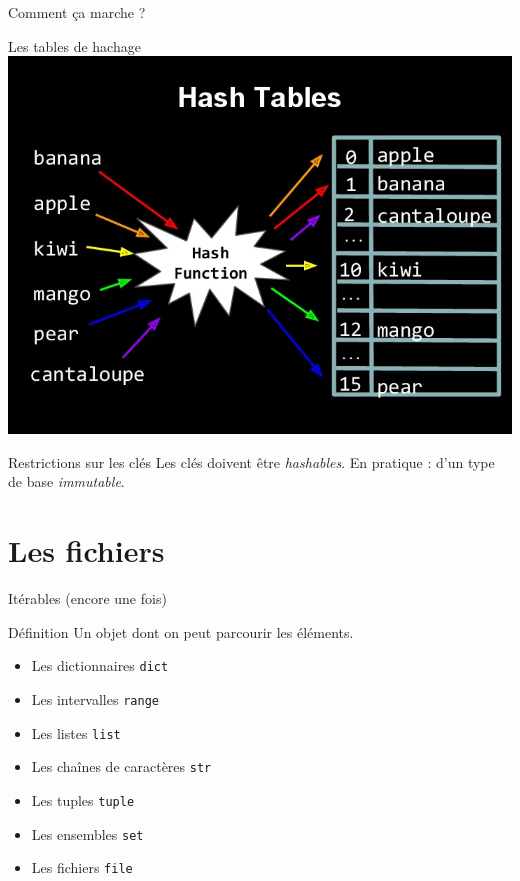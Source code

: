 \documentclass[x11names,svgnames]{beamer}
\begin{document}
\begin{frame}{Comment ça marche ?}
\begin{block}{Les tables de hachage}
  \vspace{0pt}
  \includegraphics[height=0.6\textheight]{img/hashtable.png}
\end{block}

\begin{block}{Restrictions sur les clés}
  \vspace{0pt}
  Les clés doivent être \emph{hashables}. En pratique : d'un type de base \emph{immutable}.
\end{block}
\end{frame}



\section{Les fichiers}

\begin{frame}{Itérables (encore une fois)}

  \begin{block}{Définition}
    \vspace{0pt}
    Un objet dont on peut parcourir les éléments.
    \begin{itemize}
    \item[\MVRightarrow{}] Les dictionnaires \texttt{dict}
    \item[\MVRightarrow{}] Les intervalles \texttt{range}
    \item[\MVRightarrow{}] Les listes \texttt{list}
    \item[\MVRightarrow{}] Les chaînes de caractères \texttt{str}
    \item[\MVRightarrow{}] Les tuples \texttt{tuple}
    \item Les ensembles \texttt{set}
    \item \alert{Les fichiers \texttt{file}}
    \end{itemize}
  \end{block}
\end{frame}
\end{document}
